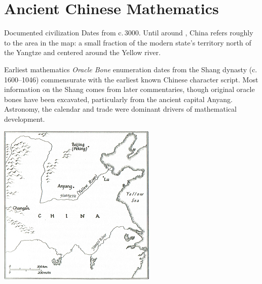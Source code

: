 \graphicspath{{5china/pics/}}

\section{Ancient Chinese Mathematics}

\begin{description}\itemsep2pt
	\begin{minipage}[t]{0.62\linewidth}\vspace{-10pt}
	  \item[Documented civilization] Dates from c.\,3000\BC. Until around , China refers roughly to the area in the map: a small fraction of the modern state's territory north of the Yangtze and centered around the Yellow river. %
	  \vspace{4pt}
	  
	  \item[Earliest mathematics] \emph{Oracle Bone} enumeration dates from the Shang dynasty (c.\,1600--1046\BC) commensurate with the earliest known Chinese character script. Most information on the Shang comes from later commentaries, though original oracle bones have been excavated, particularly from the ancient capital Anyang. Astronomy, the calendar and trade were dominant drivers of mathematical development.
	\end{minipage}
	\hfill
	\begin{minipage}[t]{0.37\linewidth}\vspace{-20pt}
		\flushright\includegraphics[scale=0.73]{AncientChina-small.png}
	\end{minipage}


\end{description}
